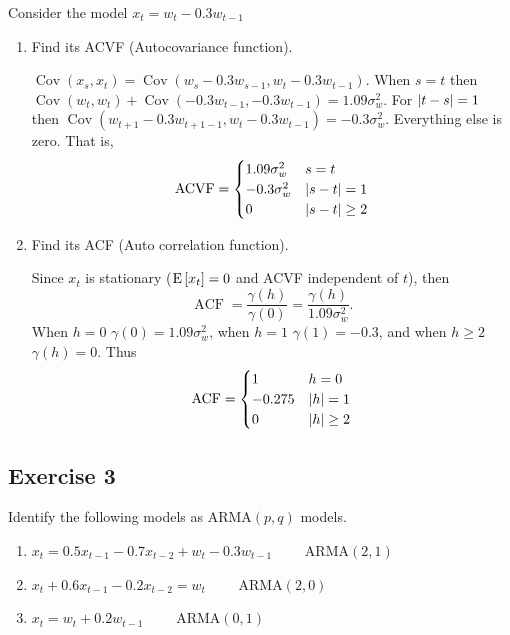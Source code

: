 \documentclass[12pt]{article}
\def\Cov{\operatorname{Cov}} %
\newcommand{\nl}{\vspace{0.1in}\noindent}
\begin{document}
\nl 

Consider the model $x_t = w_t - 0.3 w_{t-1}$
\begin{enumerate}[label=(\alph*)]
    \item Find its ACVF (Autocovariance function).
    
    \nl \soln* $\Cov(x_s, x_t) = \Cov(w_s - 0.3w_{s-1}, w_t - 0.3w_{t-1})$. When $s = t$ then $\Cov(w_t, w_t) + \Cov(-0.3w_{t-1}, -0.3w_{t-1}) = 1.09 \sigma_w^2$. For $\abs{t-s} = 1$ then $\Cov(w_{t+1}-0.3w_{t+1-1}, w_t - 0.3w_{t-1}) = -0.3 \sigma_w^2$. Everything else is zero. That is, 
    $$\operatorname{ACVF} = \begin{cases}
        1.09 \sigma_w^2 & s=t\\ -0.3 \sigma_w^2 & \abs{s-t} = 1\\ 0 & \abs{s-t} \geq 2
    \end{cases}$$


    \item Find its ACF (Auto correlation function). 
    
    \nl \soln* Since $x_t$ is stationary ($\Eb{x_t} = 0$ and ACVF independent of $t$), then $$
        \operatorname{ACF} = \frac{\gamma(h)}{\gamma(0)}
        = \frac{\gamma(h)}{1.09 \sigma_w^2}.
    $$
    When $h=0$ $\gamma(0) = 1.09\sigma_w^2$, when $h=1$ $\gamma(1) = -0.3$, and when $h\geq 2$ $\gamma(h) = 0$. 
    Thus $$\operatorname{ACF} = \begin{cases}
        1 & h=0\\ -0.275 & \abs{h} = 1 \\ 0 & \abs{h} \geq 2
        \end{cases}$$
\end{enumerate}

\subsection{Exercise 3}
Identify the following models as ARMA$(p,q)$ models.
\begin{enumerate}[label=(\alph*)]
    \item $x_t = 0.5 x_{t-1} - 0.7 x_{t-2} + w_t - 0.3w_{t-1}\qquad$ ARMA$(2, 1)$
    \item $x_t + 0.6 x_{t-1} - 0.2x_{t-2} = w_t\qquad$ ARMA$(2, 0)$
    \item $x_t = w_t + 0.2w_{t-1}\qquad$ ARMA$(0, 1)$
\end{enumerate}
\end{document}
